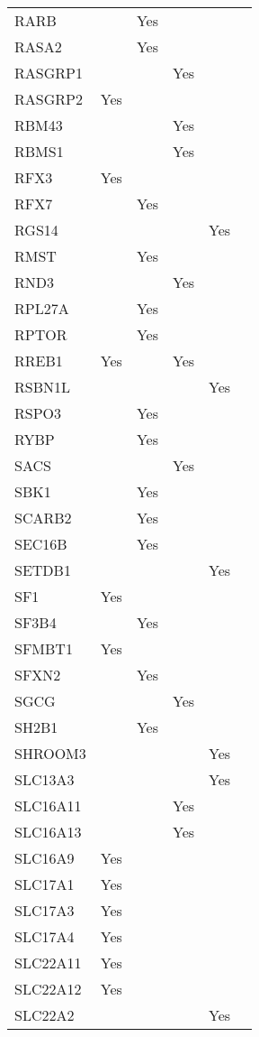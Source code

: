 \documentclass[twoside,openright]{report}
\begin{document}
\begin{appendices}
\begin{longtable}[t]{llllll}
RARB &  & Yes &  &  & \\
RASA2 &  & Yes &  &  & \\
RASGRP1 &  &  & Yes &  & \\
RASGRP2 & Yes &  &  &  & \\
RBM43 &  &  & Yes &  & \\
RBMS1 &  &  & Yes &  & \\
RFX3 & Yes &  &  &  & \\
RFX7 &  & Yes &  &  & \\
RGS14 &  &  &  & Yes & \\
RMST &  & Yes &  &  & \\
RND3 &  &  & Yes &  & \\
RPL27A &  & Yes &  &  & \\
RPTOR &  & Yes &  &  & \\
RREB1 & Yes &  & Yes &  & \\
RSBN1L &  &  &  & Yes & \\
RSPO3 &  & Yes &  &  & \\
RYBP &  & Yes &  &  & \\
SACS &  &  & Yes &  & \\
SBK1 &  & Yes &  &  & \\
SCARB2 &  & Yes &  &  & \\
SEC16B &  & Yes &  &  & \\
SETDB1 &  &  &  & Yes & \\
SF1 & Yes &  &  &  & \\
SF3B4 &  & Yes &  &  & \\
SFMBT1 & Yes &  &  &  & \\
SFXN2 &  & Yes &  &  & \\
SGCG &  &  & Yes &  & \\
SH2B1 &  & Yes &  &  & \\
SHROOM3 &  &  &  & Yes & \\
SLC13A3 &  &  &  & Yes & \\
SLC16A11 &  &  & Yes &  & \\
SLC16A13 &  &  & Yes &  & \\
SLC16A9 & Yes &  &  &  & \\
SLC17A1 & Yes &  &  &  & \\
SLC17A3 & Yes &  &  &  & \\
SLC17A4 & Yes &  &  &  & \\
SLC22A11 & Yes &  &  &  & \\
SLC22A12 & Yes &  &  &  & \\
SLC22A2 &  &  &  & Yes & \\

\end{longtable}
\end{appendices}
\end{document}

